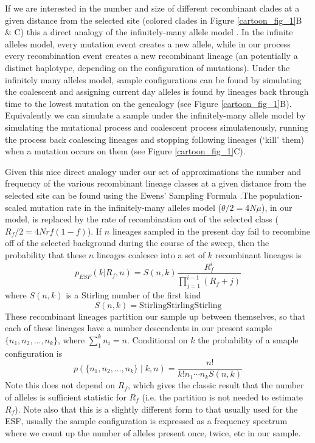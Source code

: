 \documentclass[a4paper,10pt]{article}
\begin{document}
If we are interested in the number and size of different recombinant clades at a given distance from the selected site (colored clades in Figure \ref{cartoon_fig_1}B \& C)  this a direct analogy of the infinitely-many allele model \citep{}. In the infinite alleles model, every mutation event creates a new allele, while in our process every recombination event creates a new recombinant lineage (an potentially a distinct haplotype, depending on the configuration of mutations). Under the infinitely many alleles model, sample configurations can be found by simulating the coalescent and assigning current day alleles is found by lineages back through time to the lowest mutation on the genealogy (see Figure \ref{cartoon_fig_1}B). Equivalently we can simulate a sample under the infinitely-many allele model by simulating the mutational process and coalescent process simulatenously, running the process back coalescing lineages and stopping following lineages (`kill' them) when a mutation occurs on them (see Figure \ref{cartoon_fig_1}C). 

Given this nice direct analogy under our set of approximations the number and frequency of the various recombinant lineage classes at a given distance from the selected site can be found using the Ewens' Sampling Formula \citep[ESF][]{}.The population-scaled mutation rate in the infinitely-many alleles model ($\theta/2=4N\mu$), in our model, is replaced by the rate of recombination out of the selected class ($R_{f}/2=4Nrf(1-f)$). If $n$ lineages sampled in the present day fail to recombine off of the selected background during the course of the sweep, then the probability that these $n$ lineages coalesce into a set of $k$ recombinant lineages is 
\begin{equation}
p_{ESF}(k | R_f,n)  = S(n,k) \frac{R_f^i}{ \prod_{j=1}^{i-1} (R_f +j) }  \label{ESF1}
\end{equation}
where $S(n,k)$ is a Stirling number of the first kind
\begin{equation}
S(n,k) = \textrm{StirlingStirlingStirling}
\end{equation}
These recombinant lineages partition our sample up between themselves, so that each of these lineages have a number descendents in our present sample$\{n_1,n_2,\dots,n_k\}$, where $\sum_1^k n_i =n$. Conditional on $k$ the probability of a smaple configuration is
\begin{equation}
p(\{n_1,n_2,\dots,n_k\} \mid k,n) = \frac{n!}{k! n_1\cdots n_k S(n,k)}  \label{ESF2}
\end{equation}
Note this does not depend on $R_f$, which gives the classic result that the number of alleles is sufficient statistic for $R_f$ (i.e. the partition is not needed to estimate $R_f$). Note also that this is a slightly different form to that usually used for the ESF, usually the sample configuration is expressed as a frequency spectrum where we count up the number of alleles present once, twice, etc in our sample.
\end{document}
